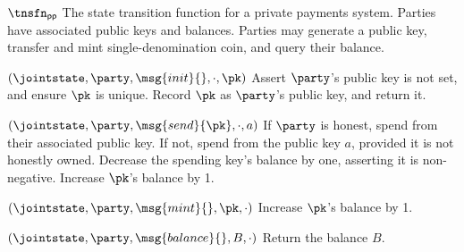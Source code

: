\begin{transitionfnsketch}{$\tnsfn_{\mathsf{pp}}$}
  The state transition function for a private payments system. Parties have
  associated public keys and balances. Parties may generate a public key,
  transfer and mint single-denomination coin, and query their balance.

  \vsep

  \begin{receiveinputsketch*}{$(\jointstate, \party, \msg{init}{}, \cdot, \pk)$}
    Assert $\party$'s public key is not set, and ensure $\pk$ is unique. Record
    $\pk$ as $\party$'s public key, and return it.
  \end{receiveinputsketch*}

  \begin{receiveinputsketch*}{$(\jointstate, \party, \msg{send}{\pk}, \cdot, a)$}
    If $\party$ is honest, spend from their associated public key. If not, spend
    from the public key $a$, provided it is not honestly owned. Decrease the
    spending key's balance by one, asserting it is non-negative. Increase $\pk$'s
    balance by 1.
  \end{receiveinputsketch*}

  \begin{receiveinputsketch*}{$(\jointstate, \party, \msg{mint}{}, \pk, \cdot)$}
    Increase $\pk$'s balance by 1.
  \end{receiveinputsketch*}

  \begin{receiveinputsketch*}{$(\jointstate, \party, \msg{balance}{}, B, \cdot)$}
    Return the balance $B$.
  \end{receiveinputsketch*}

\end{transitionfnsketch}

